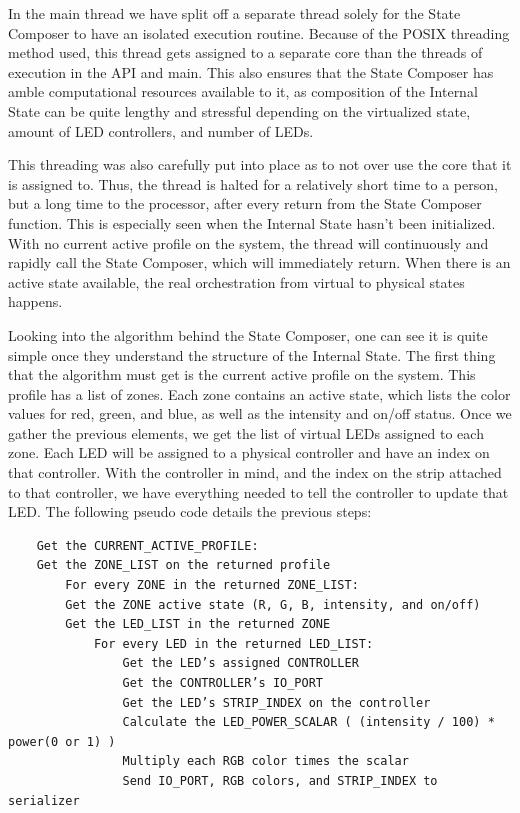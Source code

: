 \documentclass[onecolumn, draftclsnofoot,10pt, compsoc]{IEEEtran}
\begin{document}
	\noindent In the main thread we have split off a separate thread solely for the State Composer to have an isolated execution routine.
	Because of the POSIX threading method used, this thread gets assigned to a separate core than the threads of execution in the API and main.
	This also ensures that the State Composer has amble computational resources available to it, as composition of the Internal State can be
	quite lengthy and stressful depending on the virtualized state, amount of LED controllers, and number of LEDs.

	\noindent This threading was also carefully put into place as to not over use the core that it is assigned to.
	Thus, the thread is halted for a relatively short time to a person, but a long time to the processor, after every return from the State
	Composer function. This is especially seen when the Internal State hasn’t been initialized. With no current active profile on the system,
	the thread will continuously and rapidly call the State Composer, which will immediately return. When there is an active state available,
	the real orchestration from virtual to physical states happens.

	\noindent Looking into the algorithm behind the State Composer, one can see it is quite simple once they understand the structure of the
	Internal State. The first thing that the algorithm must get is the current active profile on the system.  This profile has a list of zones.
	Each zone contains an active state, which lists the color values for red, green, and blue, as well as the intensity and on/off status. Once
	we gather the previous elements, we get the list of virtual LEDs assigned to each zone. Each LED will be assigned to a physical controller
	and have an index on that controller. With the controller in mind, and the index on the strip attached to that controller, we have everything
	needed to tell the controller to update that LED. The following pseudo code details the previous steps:

	\begin{lstlisting}
	Get the CURRENT_ACTIVE_PROFILE:
	Get the ZONE_LIST on the returned profile
		For every ZONE in the returned ZONE_LIST:
		Get the ZONE active state (R, G, B, intensity, and on/off)
		Get the LED_LIST in the returned ZONE
			For every LED in the returned LED_LIST:
				Get the LED’s assigned CONTROLLER
				Get the CONTROLLER’s IO_PORT
				Get the LED’s STRIP_INDEX on the controller
				Calculate the LED_POWER_SCALAR ( (intensity / 100) * power(0 or 1) )
				Multiply each RGB color times the scalar
				Send IO_PORT, RGB colors, and STRIP_INDEX to serializer
	\end{lstlisting}
\end{document}
